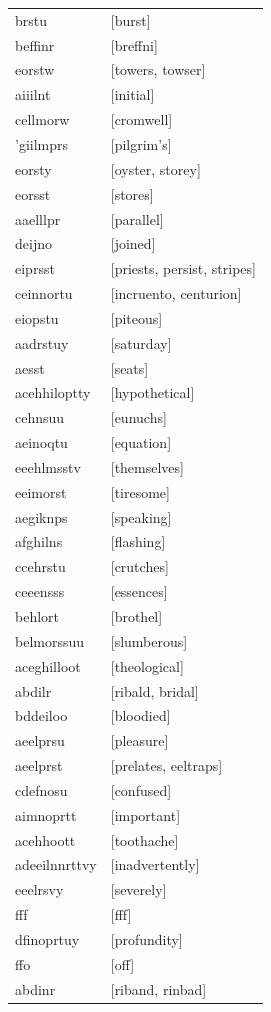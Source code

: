 \documentclass{article}
\begin{document}
\begin{tabular}{ll}
brstu & [burst] \\
beffinr & [breffni] \\
eorstw & [towers, towser] \\
aiiilnt & [initial] \\
cellmorw & [cromwell] \\
'giilmprs & [pilgrim's] \\
eorsty & [oyster, storey] \\
eorsst & [stores] \\
aaelllpr & [parallel] \\
deijno & [joined] \\
eiprsst & [priests, persist, stripes] \\
ceinnortu & [incruento, centurion] \\
eiopstu & [piteous] \\
aadrstuy & [saturday] \\
aesst & [seats] \\
acehhiloptty & [hypothetical] \\
cehnsuu & [eunuchs] \\
aeinoqtu & [equation] \\
eeehlmsstv & [themselves] \\
eeimorst & [tiresome] \\
aegiknps & [speaking] \\
afghilns & [flashing] \\
ccehrstu & [crutches] \\
ceeensss & [essences] \\
behlort & [brothel] \\
belmorssuu & [slumberous] \\
aceghilloot & [theological] \\
abdilr & [ribald, bridal] \\
bddeiloo & [bloodied] \\
aeelprsu & [pleasure] \\
aeelprst & [prelates, eeltraps] \\
cdefnosu & [confused] \\
aimnoprtt & [important] \\
acehhoott & [toothache] \\
adeeilnnrttvy & [inadvertently] \\
eeelrsvy & [severely] \\
fff & [fff] \\
dfinoprtuy & [profundity] \\
ffo & [off] \\
abdinr & [riband, rinbad] \\

\end{tabular}
\end{document}
